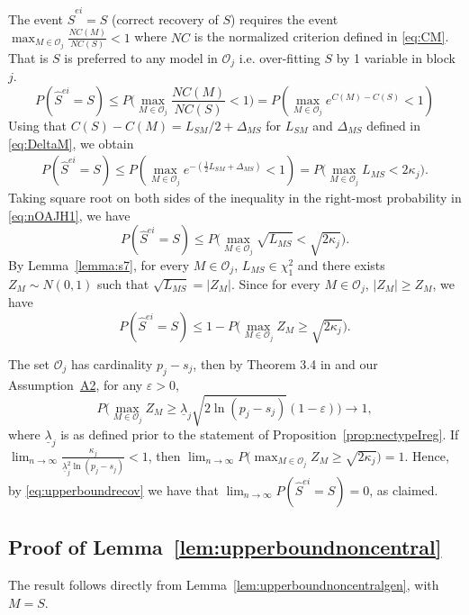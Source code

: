 \documentclass[
  12pt]{article}
\newcommand{\OO}{\mathcal{O}}
\begin{document}
The event $\hat{S}^{ei}=S$ (correct recovery of $S$) requires the event 
$\max_{M\in \OO_j}\frac{NC(M)}{NC(S)}<1$ where $NC$ is the normalized criterion defined in \eqref{eq:CM}. That is $S$ is preferred to any model in $\OO_j$ i.e. over-fitting $S$ by 1 variable in block $j$. 
$$P(\hat{S}^{ei}=S) 
\leq P\Big(\max_{M\in \OO_j}\frac{NC(M)}{NC(S)}<1\Big)
= P \left( \max_{M\in \OO_j} e^{C(M)-C(S)} <1 \right)$$
Using that $C(S)-C(M)=L_{SM}/2 + \Delta_{MS}$ for $L_{SM}$ and $\Delta_{MS}$ defined in \eqref{eq:DeltaM}, we obtain
\begin{align}\label{eq:nOAJH1}
P(\hat{S}^{ei}=S) 
\leq P \left( \max_{M\in \OO_j} e^{-(\frac{1}{2} L_{SM} + \Delta_{MS})} < 1 \right)
=
P\Big(\max_{M\in \OO_j}L_{MS}<2\kappa_j\Big).
\end{align}
Taking square root on both sides of the inequality in the right-most probability in \eqref{eq:nOAJH1}, we have
\begin{equation}\label{eq:oSBV}
    P(\hat{S}^{ei}=S) 
\leq P\Big(\max_{M\in \OO_j}\sqrt{L_{MS}}<\sqrt{2\kappa_j}\Big).
\end{equation}
By Lemma~\ref{lemma:s7}, for every $M\in \OO_j$, $L_{MS}\in \chi^2_1$ and there exists $Z_M\sim N(0,1)$ such that $\sqrt{L_{MS}}=|Z_M|$. Since for every $M\in \OO_j$, $|Z_M|\geq Z_M$, we have
\begin{equation}\label{eq:upperboundrecov}
    P(\hat{S}^{ei}=S) \leq  1-P\big(\max_{M\in \OO_j}Z_M\geq\sqrt{2\kappa_j}\Big).
\end{equation}

The set $\OO_j$ has cardinality $p_j-s_j$, then by Theorem 3.4 in \cite{hartigan} and our Assumption~\hyperlink{lab:A2}{A2}, for any $\varepsilon>0$,
$$P\big(\max_{M\in \OO_j}Z_M \geq \underline{\lambda}_j \sqrt{2 \ln(p_j-s_j)}(1-\varepsilon)\big) \to 1,$$
where $\underline{\lambda}_j$ is as defined prior to the statement of Proposition~\ref{prop:nectypeIreg}.
If $\lim_{n\to\infty}\frac{\kappa_j}{\underline{\lambda}_j^2\ln(p_j-s_j)} <1$, then $\lim_{n \to \infty} P\big(\max_{M\in \OO_j}Z_M\geq\sqrt{2\kappa_j}\big) = 1$. Hence, by \eqref{eq:upperboundrecov} we have that $\lim_{n \to \infty} P(\hat{S}^{ei}=S) = 0$, as claimed.

\subsection{Proof of Lemma~\ref{lem:upperboundnoncentral}}
The result follows directly from Lemma~\ref{lem:upperboundnoncentralgen}, with $M=S$. 
\end{document}
